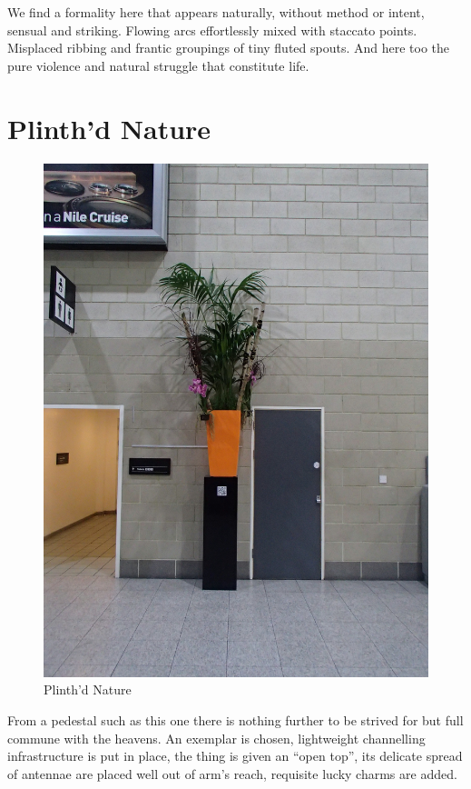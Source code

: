 \documentclass{article}
\begin{document}
We find a formality here that appears naturally, without method or intent,
sensual and striking. Flowing arcs effortlessly mixed with staccato points.
Misplaced ribbing and frantic groupings of tiny fluted spouts. And here too
the pure violence and natural struggle that constitute life.

\chapter{Plinth'd Nature}

\begin{figure}
\centering
\includegraphics[width=\textwidth,angle=90]{figures/P1050143.JPG}
\caption{Plinth'd Nature}
\end{figure}

From a pedestal such as this one there is nothing further to be strived for but
full commune with the heavens. An exemplar is chosen, lightweight channelling
infrastructure is put in place, the thing is given an ``open top'', its
delicate spread of antennae are placed well out of arm's reach, requisite lucky
charms are added.
\end{document}
